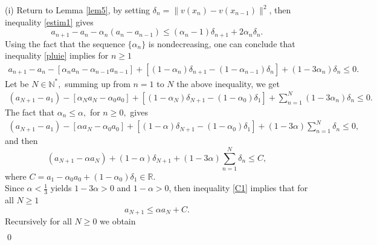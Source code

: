 \documentclass[11pt]{article}
\makeatletter
\renewenvironment{proof}[1][\proofname]{\par
	\normalfont
	\topsep0\p@\@plus3\p@ \trivlist
	\item[\hskip\labelsep\itshape
	#1\@addpunct{.}]\ignorespaces
}{%
	\qed\endtrivlist
}
\theoremstyle{definition}
\theoremstyle{definition}
\theoremstyle{definition}
\makeatother
\begin{document}
\begin{proof}
	(i) Return to Lemma \ref{lem5}, by setting $\delta_n=\|v(x_n)-v(x_{n-1})\|^2$, then inequality \eqref{estim1} gives
	\begin{equation}\label{pluie}
	a_{n+1}-a_n-\alpha_n(a_n-a_{n-1})\leq (\alpha_n-1)\delta_{n+1}+2\alpha_n\delta_{n}.
	\end{equation}
	Using the fact that the sequence $\{\alpha_n\}$ is nondecreasing,  one can conclude that inequality \eqref{pluie} implies for $n\geq1$
	\begin{equation*}
	\begin{array}{l}
	a_{n+1}-a_n-\left[\alpha_n a_n- \alpha_{n-1}a_{n-1}\right]+\left[(1-\alpha_n)\delta_{n+1}-(1-\alpha_{n-1})\delta_{n}\right]+\left(1-3\alpha_n\right)\delta_n\leq 0.
	\end{array}
	\end{equation*}
	Let be $N\in \mathbb{N}^*,$ summing up  from $n=1$ to $N$  the above inequality, we get
	\begin{equation}\label{arg}
	\begin{array}{l}
	(a_{N+1}-a_1)- \left[\alpha_N a_N- \alpha_{0}a_{0}\right]+ \left[(1-\alpha_{N})\delta_{N+1}-(1-\alpha_{0})\delta_{1}\right]+\sum_{n=1}^N (1-3\alpha_n)\delta_n
	\leq 0.
	\end{array}
	\end{equation} 
	The fact that $\alpha_n\leq \alpha,$ for $n\geq 0,$  gives 
	\begin{equation}\label{soleil}
	\begin{array}{l}
	(a_{N+1}-a_1)- \left[\alpha a_N- \alpha_{0}a_{0}\right]+ \left[(1-\alpha)\delta_{N+1}-(1-\alpha_{0})\delta_{1}\right]+(1-3\alpha)\sum_{n=1}^N \delta_n
	\leq 0,
	\end{array}
	\end{equation} 
	and then
	\begin{equation}\label{C1}
	(a_{N+1}-\alpha a_N)+(1-\alpha)\delta_{N+1}+(1-3\alpha)\sum_{n=1}^N\delta_n\leq C
	,\end{equation}
	where $C=a_1-\alpha_0 a_0+(1-\alpha_0)\delta_1\in \mathbb{R}.$\\
	Since $\alpha <\frac{1}{3}$ yields $1-3\alpha>0$ and $1-\alpha>0$, then inequality \eqref{C1} implies that  for all $N\geq 1$
	\begin{equation}\label{C2}
	a_{N+1}\leq \alpha a_N+C. \end{equation}
	Recursively for all $
	N\geq  0$ we obtain 
	\begin{align*}

\end{align*}
\end{proof}
\end{document}
